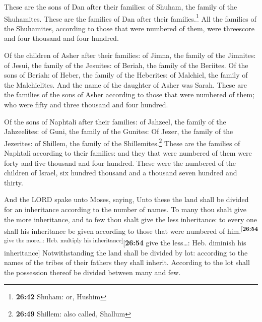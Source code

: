  These are the sons of Dan after their families: of
Shuham, the family of the Shuhamites. These are the families of Dan
after their families.\footnote{\textbf{26:42} Shuham: or, Hushim}
 All the families of the Shuhamites, according to those
that were numbered of them, were threescore and four thousand and four
hundred.

 Of the children of Asher after their families: of Jimna,
the family of the Jimnites: of Jesui, the family of the Jesuites: of
Beriah, the family of the Beriites.  Of the sons of
Beriah: of Heber, the family of the Heberites: of Malchiel, the family
of the Malchielites.  And the name of the daughter of
Asher was Sarah.  These are the families of the sons of
Asher according to those that were numbered of them; who were fifty and
three thousand and four hundred.

 Of the sons of Naphtali after their families: of
Jahzeel, the family of the Jahzeelites: of Guni, the family of the
Gunites:  Of Jezer, the family of the Jezerites: of
Shillem, the family of the Shillemites.\footnote{\textbf{26:49} Shillem:
  also called, Shallum}  These are the families of
Naphtali according to their families: and they that were numbered of
them were forty and five thousand and four hundred. 
These were the numbered of the children of Israel, six hundred thousand
and a thousand seven hundred and thirty.

 And the LORD spake unto Moses, saying, 
Unto these the land shall be divided for an inheritance according to the
number of names.  To many thou shalt give the more
inheritance, and to few thou shalt give the less inheritance: to every
one shall his inheritance be given according to those that were numbered
of him.\textsuperscript{{[}\textbf{26:54} give the more\ldots: Heb.
multiply his inheritance{]}}{[}\textbf{26:54} give the less\ldots: Heb.
diminish his inheritance{]}  Notwithstanding the land
shall be divided by lot: according to the names of the tribes of their
fathers they shall inherit.  According to the lot shall
the possession thereof be divided between many and few.

